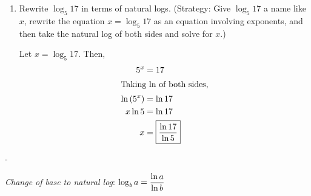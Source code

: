 \documentclass{article}
\makeatletter
\newlength{\tipmargin}
\renewenvironment{framed}{
  \setlength{\tipmargin}{\textwidth-\linewidth}
  \advance\@totalleftmargin-\tipmargin
  \def\FrameCommand{\hspace{\tipmargin}\fbox}%
  \advance\linewidth\tipmargin
  \MakeFramed {\advance\hsize-\width \FrameRestore}%
}
{\endMakeFramed}
\makeatother
\begin{document}
\begin{enumerate}[resume]
  \begin{solution}
    \begin{center}
    \end{center}
    All of the graphs have an $x$-intercept at $(1,0)$, and they
    all have a vertical asymptote of $x=0$.
  \end{solution}

\item  \label{log-base-b-in-terms-of-ln-example}

  \begin{problem}[\vfill]
    Rewrite $\log_5 17$ in terms of natural logs.  (Strategy: Give $\log_5
    17$ a name like $x$, rewrite the equation $x = \log_5 17$ as an
    equation involving exponents, and then take the natural log of both
    sides and solve for $x$.)
  \end{problem}

  \begin{solution}
    Let $x = \log_5 17$. Then,
    \begin{align*}
      5^x &= 17 \\
      \intertext{Taking ln of both sides,}
      \ln \left( 5^x \right) &= \ln 17 \\
      x \ln 5 &= \ln 17 \\
      x &= \boxed{\frac{\ln 17}{\ln 5}}
    \end{align*}
  \end{solution}

\end{enumerate}
\begin{framed}  
  \emph{Change of base to natural log}: $\log_b a = \dfrac{\ln a}{\ln b}$
\end{framed}
\end{document}
